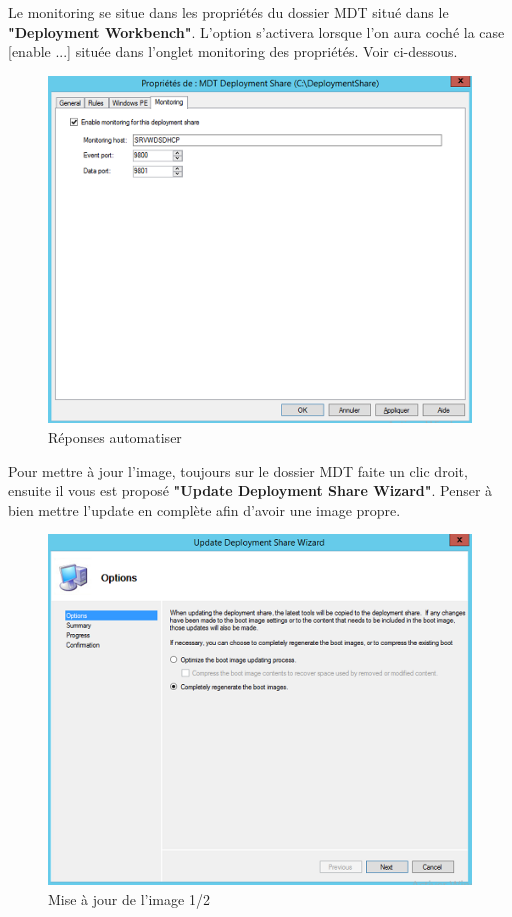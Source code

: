 \documentclass[11pt,a4paper,oneside]{article}
\begin{document}
\newpage
Le monitoring se situe dans les propriétés du dossier MDT situé dans le \textbf{"Deployment Workbench"}. L'option s'activera lorsque l'on aura coché la case [enable ...] située dans l'onglet monitoring des propriétés. Voir ci-dessous.
\begin{figure}[hbtp]
\centering
\includegraphics[scale=0.7]{Pictures/MDT/MDT9.png}
\caption{\label{etiquette} Réponses automatiser}
\end{figure}

Pour mettre à jour l'image, toujours sur le dossier MDT faite un clic droit, ensuite il vous est proposé \textbf{"Update Deployment Share Wizard"}.
Penser à bien mettre l'update en complète afin d'avoir une image propre.
\begin{figure}[hbtp]
\centering
\includegraphics[scale=0.7]{Pictures/MDT/MDT10.png}
\caption{\label{etiquette} Mise à jour de l'image 1/2}
\end{figure}
\end{document}
